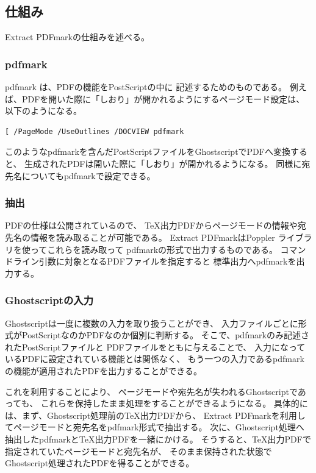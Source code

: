 \documentclass[twocolumn,jafontscale=0.962216,jlreq_notes]{jlreq}
\begin{document}
\subsection{仕組み}

Extract PDFmarkの仕組みを述べる。

\subsubsection{pdfmark}

pdfmark \cite{pdfmark}は、PDFの機能をPostScriptの中に
記述するためのものである。
例えば、PDFを開いた際に「しおり」が開かれるようにするページモード設定は、
以下のようになる。

\begin{tcolorbox}[left=0mm,right=0mm,top=0mm,bottom=0mm]
\begin{lstlisting}
[ /PageMode /UseOutlines /DOCVIEW pdfmark
\end{lstlisting}
\end{tcolorbox}

このようなpdfmarkを含んだPostScriptファイルをGhostscriptでPDFへ変換すると、
生成されたPDFは開いた際に「しおり」が開かれるようになる。
同様に宛先名についてもpdfmarkで設定できる。

\subsubsection{抽出}

PDFの仕様は公開されているので、
\TeX 出力PDFからページモードの情報や宛先名の情報を読み取ることが可能である。
Extract PDFmarkはPoppler \cite{poppler}ライブラリを使ってこれらを読み取って
pdfmarkの形式で出力するものである。
コマンドライン引数に対象となるPDFファイルを指定すると
標準出力へpdfmarkを出力する。

\subsubsection{Ghostscriptの入力}

Ghostscriptは一度に複数の入力を取り扱うことができ、
入力ファイルごとに形式がPostScriptなのかPDFなのか個別に判断する。
そこで、pdfmarkのみ記述されたPostScriptファイルと
PDFファイルをともに与えることで、
入力になっているPDFに設定されている機能とは関係なく、
もう一つの入力であるpdfmarkの機能が適用されたPDFを出力することができる。

これを利用することにより、
ページモードや宛先名が失われるGhostscriptであっても、
これらを保持したまま処理をすることができるようになる。
具体的には、まず、Ghostscript処理前の\TeX 出力PDFから、
Extract PDFmarkを利用してページモードと宛先名をpdfmark形式で抽出する。
次に、Ghostscript処理へ抽出したpdfmarkと\TeX 出力PDFを一緒にかける。
そうすると、\TeX 出力PDFで指定されていたページモードと宛先名が、
そのまま保持された状態でGhostscript処理されたPDFを得ることができる。
\end{document}
